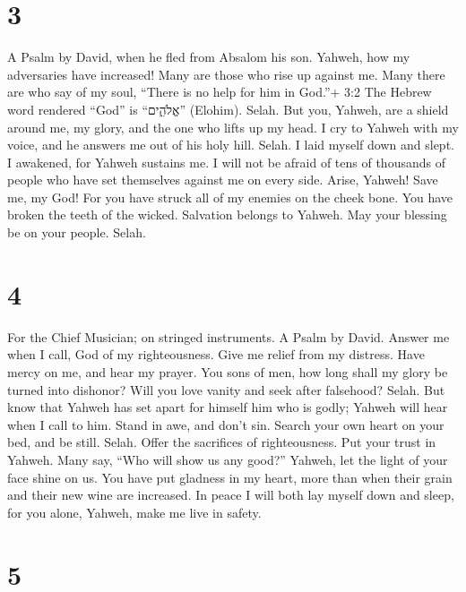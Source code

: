 \hypertarget{section-2}{%
\section{3}\label{section-2}}

A Psalm by David, when he fled from Absalom his son. 
Yahweh, how my adversaries have increased! Many are those who rise up
against me.  Many there are who say of my soul, ``There is
no help for him in God.''+ 3:2 The Hebrew word rendered ``God'' is
``אֱלֹהִ֑ים'' (Elohim). Selah.  But you, Yahweh, are a
shield around me, my glory, and the one who lifts up my head.
 I cry to Yahweh with my voice, and he answers me out of his
holy hill. Selah.  I laid myself down and slept. I awakened,
for Yahweh sustains me.  I will not be afraid of tens of
thousands of people who have set themselves against me on every side.
 Arise, Yahweh! Save me, my God! For you have struck all of
my enemies on the cheek bone. You have broken the teeth of the wicked.
 Salvation belongs to Yahweh. May your blessing be on your
people. Selah.

\hypertarget{section-3}{%
\section{4}\label{section-3}}

For the Chief Musician; on stringed instruments. A Psalm by David.
 Answer me when I call, God of my righteousness. Give me
relief from my distress. Have mercy on me, and hear my prayer.
 You sons of men, how long shall my glory be turned into
dishonor? Will you love vanity and seek after falsehood? Selah.
 But know that Yahweh has set apart for himself him who is
godly; Yahweh will hear when I call to him.  Stand in awe,
and don't sin. Search your own heart on your bed, and be still. Selah.
 Offer the sacrifices of righteousness. Put your trust in
Yahweh.  Many say, ``Who will show us any good?'' Yahweh,
let the light of your face shine on us.  You have put
gladness in my heart, more than when their grain and their new wine are
increased.  In peace I will both lay myself down and sleep,
for you alone, Yahweh, make me live in safety.

\hypertarget{section-4}{%
\section{5}\label{section-4}}

